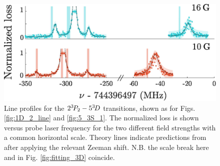 \begin{figure}
	\centering
	\includegraphics[width=\textwidth]{fig/spectroscopy/ci-plot-53D}
   \caption{Line profiles for the $2^{3\!}P_2 -  5^{3\!}D$ transitions, shown as for Figs.
	\ref{fig:1D_2_line} and \ref{fig:5_3S_1}.
	The normalized loss is shown versus probe laser frequency for the two different field strengths with a common horizontal scale.
	Theory lines indicate predictions from \cite{Drake07} after applying the relevant Zeeman shift.
	N.B.	the scale break here and in Fig.	\ref{fig:fitting_3D} coincide.}
    \label{fig:combined_5D_lines}
\end{figure}


